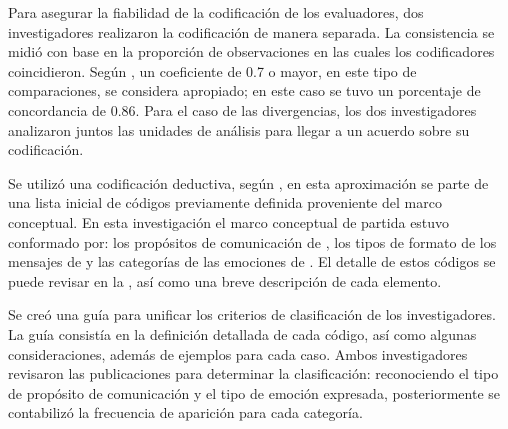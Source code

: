 \documentclass[spanish]{textolivre}
\begin{document}
Para asegurar la fiabilidad de la codificación de los evaluadores, dos investigadores realizaron la codificación de manera separada. La consistencia se midió con base en la proporción de observaciones en las cuales los codificadores coincidieron. Según \textcite{neuendorf2002}, un coeficiente de 0.7 o mayor, en este tipo de comparaciones, se considera apropiado; en este caso se tuvo un porcentaje de concordancia de 0.86. Para el caso de las divergencias, los dos investigadores analizaron juntos las unidades de análisis para llegar a un acuerdo sobre su codificación. 

Se utilizó una codificación deductiva, según \textcite{miles2013}, en esta aproximación se parte de una lista inicial de códigos previamente definida proveniente del marco conceptual. En esta investigación el marco conceptual de partida estuvo conformado por: los propósitos de comunicación de \textcite{monroe1973}, los tipos de formato de los mensajes de \textcite{pletikosaCvijikj2013} y las categorías de las emociones de \textcite{ekman1992,fredrickson2004}. El detalle de estos códigos se puede revisar en la , así como una breve descripción de cada elemento. 

Se creó una guía para unificar los criterios de clasificación de los investigadores. La guía consistía en la definición detallada de cada código, así como algunas consideraciones, además de ejemplos para cada caso. Ambos investigadores revisaron las publicaciones para determinar la clasificación: reconociendo el tipo de propósito de comunicación y el tipo de emoción expresada, posteriormente se contabilizó la frecuencia de aparición para cada categoría. 
\end{document}
